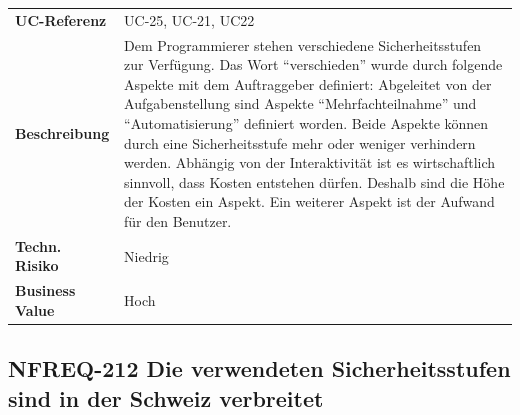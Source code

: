 \begin{longtable}[c]{@{}ll@{}}
\toprule
\begin{minipage}[t]{0.20\columnwidth}\raggedright\strut
\textbf{UC-Referenz}
\strut\end{minipage} &
\begin{minipage}[t]{0.74\columnwidth}\raggedright\strut
UC-25, UC-21, UC22
\strut\end{minipage}\tabularnewline
\begin{minipage}[t]{0.20\columnwidth}\raggedright\strut
\textbf{Beschreibung}
\strut\end{minipage} &
\begin{minipage}[t]{0.74\columnwidth}\raggedright\strut
Dem Programmierer stehen verschiedene Sicherheitsstufen zur Verfügung.
Das Wort ``verschieden'' wurde durch folgende Aspekte mit dem
Auftraggeber definiert: Abgeleitet von der Aufgabenstellung sind Aspekte
``Mehrfachteilnahme'' und ``Automatisierung'' definiert worden. Beide
Aspekte können durch eine Sicherheitsstufe mehr oder weniger verhindern
werden. Abhängig von der Interaktivität ist es wirtschaftlich sinnvoll,
dass Kosten entstehen dürfen. Deshalb sind die Höhe der Kosten ein
Aspekt. Ein weiterer Aspekt ist der Aufwand für den Benutzer.
\strut\end{minipage}\tabularnewline
\begin{minipage}[t]{0.20\columnwidth}\raggedright\strut
\textbf{Techn. Risiko}
\strut\end{minipage} &
\begin{minipage}[t]{0.74\columnwidth}\raggedright\strut
Niedrig
\strut\end{minipage}\tabularnewline
\begin{minipage}[t]{0.20\columnwidth}\raggedright\strut
\textbf{Business Value}
\strut\end{minipage} &
\begin{minipage}[t]{0.74\columnwidth}\raggedright\strut
Hoch
\strut\end{minipage}\tabularnewline
\bottomrule
\end{longtable}

\subsection{NFREQ-212 Die verwendeten Sicherheitsstufen sind in der
Schweiz
verbreitet}\label{nfreq-212-die-verwendeten-sicherheitsstufen-sind-in-der-schweiz-verbreitet}

